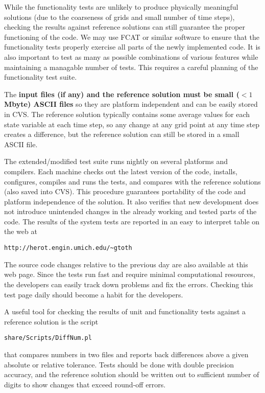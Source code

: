\documentclass{article}
\begin{document}
While the functionality tests are unlikely to produce physically 
meaningful solutions (due to the coarseness of grids and small number 
of time steps), checking the results against reference solutions 
can still guarantee the proper functioning of the code. 
We may use FCAT or similar software to ensure that
the functionality tests properly exercise all parts of the newly implemented
code. It is also important to test as many as possible combinations of 
various features while maintaining a managable number of tests. 
This requires a careful planning of the functionality test suite.

The {\bf input files (if any) and the reference solution must be small 
($<1$ Mbyte) ASCII files} so they are platform independent and can be 
easily stored in CVS.
The reference solution typically contains some average values for each
state variable at each time step, so any change at any grid point at
any time step creates a difference, but the reference solution can 
still be stored in a small ASCII file.

The extended/modified test suite runs nightly on several platforms and 
compilers. Each machine checks out the latest version of the code, 
installs, configures, compiles and runs the tests, and compares with
the reference solutions (also saved into CVS).
This procedure guarantees portability of the code and 
platform independence of the solution. It also verifies
that new development does not introduce unintended changes in the 
already working and tested parts of the code.
The results of the system tests are reported in an easy to interpret
table on the web at
\begin{verbatim}
http://herot.engin.umich.edu/~gtoth
\end{verbatim}
The source code changes relative to the previous day are 
also available at this web page.
Since the tests run fast and require minimal computational resources,
the developers can easily track down problems and fix the errors.
Checking this test page daily should become a habit for the developers.

A useful tool for checking the results of unit and functionality tests
against a reference solution is the script
\begin{verbatim}
share/Scripts/DiffNum.pl
\end{verbatim}
that compares numbers in two files and reports back differences 
above a given absolute or relative tolerance. Tests should be done with
double precision accuracy, and the reference solution should be written
out to sufficient number of digits to show changes that exceed round-off 
errors.
\end{document}
